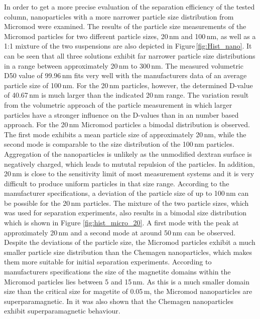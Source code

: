 In order to get a more precise evaluation of the separation efficiency of the tested column, nanoparticles with a more narrower particle size distribution from Micromod were examined. The results of the particle size measurements of the Micromod particles for two different particle sizes, 20\,nm and 100\,nm, as well as a 1:1 mixture of the two suspensions are also depicted in Figure\,\ref{fig:Hist_nano}. It can be seen that all three solutions exhibit far narrower particle size distributions in a range between approximately 20\,nm to 300\,nm. The measured volumetric D50 value of 99.96\,nm fits very well with the manufacturers data of an average particle size of 100\,nm. For the 20\,nm particles, however, the determined D-value of 40.67\,nm is much larger than the indicated 20\,nm range. The variation result from the volumetric approach of the particle measurement in which larger particles have a stronger influence on the D-values than in an number based approach. For the 20\,nm Micromod particles a bimodal distribution is observed. The first mode exhibits a mean particle size of approximately 20\,nm, while the second mode is comparable to the size distribution of the 100\,nm particles. Aggregation of the nanoparticles is unlikely as the unmodified dextran surface is negatively charged, which leads to mututal repulsion of the particles. In addition, 20\,nm is close to the sensitivity limit of most measurement systems and it is very difficult to produce uniform particles in that size range. According to the manufacturer specifications, a deviation of the particle size of up to 100\,nm can be possible for the 20\,nm particles. The mixture of the two particle sizes, which was used for separation experiments, also results in a bimodal size distribution which is shown in Figure \ref{fig:hist_micro_20}. A first mode with the peak at approximately 20\,nm and a second mode at around 50\,nm can be observed. Despite the deviations of the particle  size, the Micromod particles exhibit a much smaller particle size distribution than the Chemagen nanoparticles, which makes them more suitable for initial separation experiments. According to manufacturers specifications the size of the magnetite domains within the Micromod particles lies between 5 and 15\,nm. As this is a much smaller domain size than the critical size for magetite of 0.05\,\textmu m, the Micromod nanoparticles are superparamagnetic. In \cite{AndreMaster} it was also shown that the Chemagen nanoparticles exhibit superparamagnetic behaviour. 

